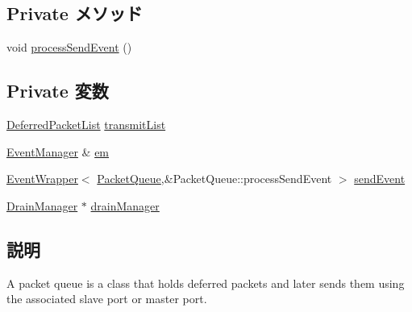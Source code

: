 \subsection*{Private メソッド}
\begin{DoxyCompactItemize}
\item 
void \hyperlink{classPacketQueue_a09299dd6109496c23923f9e4f45b6f89}{processSendEvent} ()
\end{DoxyCompactItemize}
\subsection*{Private 変数}
\begin{DoxyCompactItemize}
\item 
\hyperlink{classstd_1_1list}{DeferredPacketList} \hyperlink{classPacketQueue_a32a79d68b8d8f4f33bc27f59809eeae7}{transmitList}
\item 
\hyperlink{classEventManager}{EventManager} \& \hyperlink{classPacketQueue_a52e0dd5074be0e61097a0dadf9cda146}{em}
\item 
\hyperlink{classEventWrapper}{EventWrapper}$<$ \hyperlink{classPacketQueue}{PacketQueue},\&PacketQueue::processSendEvent $>$ \hyperlink{classPacketQueue_a2fc6007386af1667bd97ee56a71079fb}{sendEvent}
\item 
\hyperlink{classDrainManager}{DrainManager} $\ast$ \hyperlink{classPacketQueue_a329b71fb934a93312ca0aacbf5a3f982}{drainManager}
\end{DoxyCompactItemize}


\subsection{説明}
A packet queue is a class that holds deferred packets and later sends them using the associated slave port or master port. 

